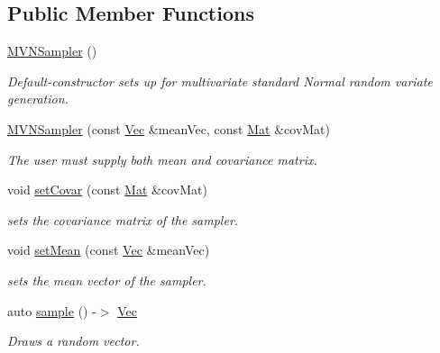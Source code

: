 \subsection*{Public Member Functions}
\begin{DoxyCompactItemize}
\item 
\hyperlink{classpf_1_1MVNSampler_ab7e165696c75108d6898db6ef0b60ac1}{M\+V\+N\+Sampler} ()
\begin{DoxyCompactList}\small\item\em Default-\/constructor sets up for multivariate standard Normal random variate generation. \end{DoxyCompactList}\item 
\hyperlink{classpf_1_1MVNSampler_a5756c28661b82c6cabd70bf023fd98b0}{M\+V\+N\+Sampler} (const \hyperlink{classpf_1_1MVNSampler_a70fb0813dd4b02e0563512c34079fee3}{Vec} \&mean\+Vec, const \hyperlink{classpf_1_1MVNSampler_a5bd837d18f475be7d0495470b6198a46}{Mat} \&cov\+Mat)
\begin{DoxyCompactList}\small\item\em The user must supply both mean and covariance matrix. \end{DoxyCompactList}\item 
void \hyperlink{classpf_1_1MVNSampler_a756c9b3cfd59f9a20f2f6568d9661695}{set\+Covar} (const \hyperlink{classpf_1_1MVNSampler_a5bd837d18f475be7d0495470b6198a46}{Mat} \&cov\+Mat)
\begin{DoxyCompactList}\small\item\em sets the covariance matrix of the sampler. \end{DoxyCompactList}\item 
void \hyperlink{classpf_1_1MVNSampler_a4dc0dbf7600f0f0b0087472baf8e56bc}{set\+Mean} (const \hyperlink{classpf_1_1MVNSampler_a70fb0813dd4b02e0563512c34079fee3}{Vec} \&mean\+Vec)
\begin{DoxyCompactList}\small\item\em sets the mean vector of the sampler. \end{DoxyCompactList}\item 
auto \hyperlink{classpf_1_1MVNSampler_a46bec6774945981d53c07c5145ce46d8}{sample} () -\/$>$ \hyperlink{classpf_1_1MVNSampler_a70fb0813dd4b02e0563512c34079fee3}{Vec}
\begin{DoxyCompactList}\small\item\em Draws a random vector. \end{DoxyCompactList}\end{DoxyCompactItemize}
